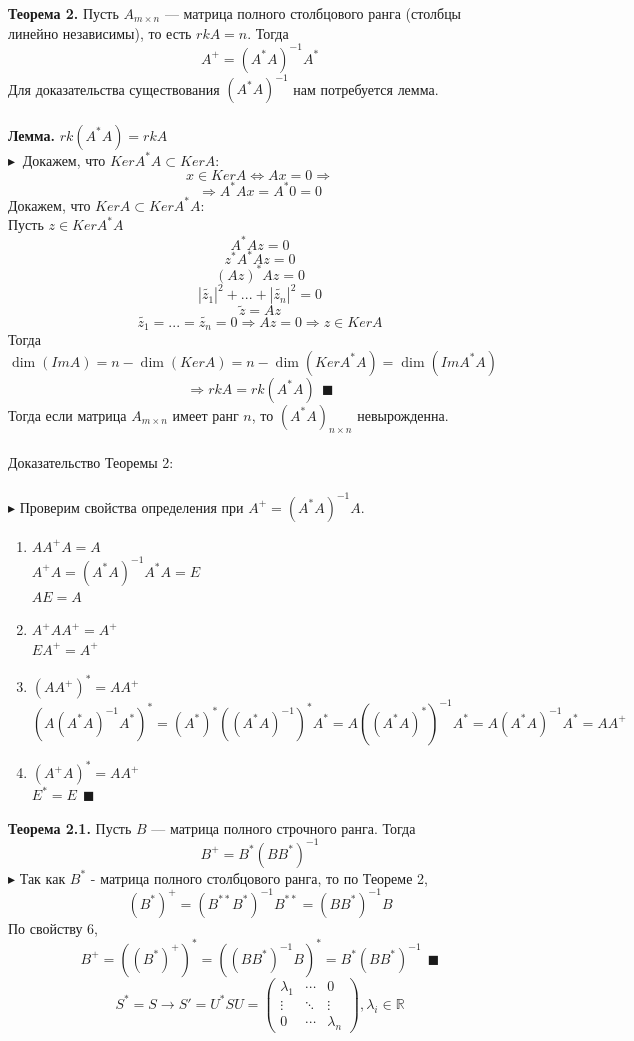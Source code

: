 \documentclass[12pt]{article}
\theoremstyle{definition}
\numberwithin{equation}{section}
\begin{document}
%
%
\textbf{Теорема 2.}
Пусть $A_{m \times n}$ --- матрица полного столбцового ранга (столбцы линейно независимы), то есть $rkA=n$. Тогда $$A^+=(A^*A)^{-1}A^*$$
Для доказательства существования $(A^*A)^{-1}$ нам потребуется лемма.\\\\
%
%
\textbf{Лемма.}
$rk(A^*A)=rkA$\\
$\blacktriangleright ~$ 
Докажем, что $Ker A^*A\subset Ker A$:
$$x\in Ker A \Leftrightarrow Ax=0\Rightarrow$$
$$\Rightarrow A^*Ax=A^* {0}=0$$
Докажем, что $Ker A\subset Ker A^*A$:\\
Пусть $z\in Ker A^*A$\\
$$A^*Az=0$$
$$z^*A^*Az=0$$
$$(Az)^*Az=0$$
$$|\tilde{z_1}|^2+...+|\tilde{z_n}|^2=0$$
$$\tilde{z}=Az$$
$$\tilde{z_1}=...=\tilde{z_n}=0 \Rightarrow Az=0 \Rightarrow z\in Ker A$$
Тогда $\dim(Im A)= n - \dim(Ker A) = n - \dim(Ker A^*A) =\dim(Im A^*A)$\\
$$\Rightarrow rk A = rk (A^*A) ~~ \blacksquare$$
%
%
Тогда если матрица $A_{m\times n}$ имеет ранг $n$, то $(A^*A)_{n\times n}$ невырожденна.\\\\
%
%
Доказательство Теоремы 2:\\\\
$\blacktriangleright$ Проверим свойства определения при $A^+=(A^*A)^{-1}A$.
\begin{enumerate}
\item $AA^+A=A$\\
$A^+A=(A^*A)^{-1}A^*A=E$\\
$AE=A$
\item $A^+AA^+=A^+$\\
$EA^+=A^+$
\item $(AA^+)^*=AA^+$\\
$(A(A^*A)^{-1}A^*)^*=(A^*)^*((A^*A)^{-1})^*A^*=A((A^*A)^*)^{-1}A^*=A(A^*A)^{-1}A^*=AA^+$
\item $(A^+A)^*=AA^+$\\
$E^*=E ~~\blacksquare$\\
\end{enumerate}
%
%
\textbf{Теорема 2.1.}
Пусть $B$ --- матрица полного строчного ранга. Тогда $$B^+=B^*(BB^*)^{-1}$$
$\blacktriangleright$ 
Так как $B^*$ - матрица полного столбцового ранга, то по Теореме 2,\\
$$(B^*)^+=(B^{**}B^*)^{-1}B^{**}
=(BB^*)^{-1}B$$
По свойству 6,
$$B^+=((B^*)^+)^*=((BB^*)^{-1}B)^*=B^*(BB^*)^{-1} ~~ \blacksquare$$
%
%
\newpage
\[S^*=S \to S'=U^*SU = \begin{pmatrix}
\lambda_1 & \cdots & 0 \\         
\vdots & \ddots & \vdots \\
0 & \cdots & \lambda_n
\end{pmatrix}, \lambda_i \in \mathbb{R}\]
\end{document}

